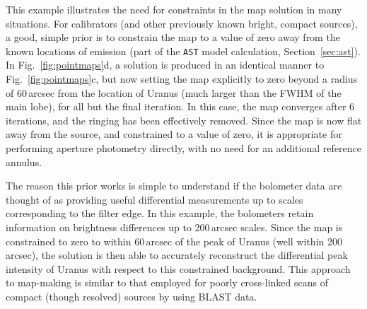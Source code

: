 \documentclass[useAMS,usenatbib,nofootinbib]{mn2e}
\newcommand{\model}[1]{\texttt{#1}}
\begin{document}
This example illustrates the need for constraints in the map solution
in many situations. For calibrators (and other previously known
bright, compact sources), a good, simple prior is to constrain the map
to a value of zero away from the known locations of emission (part of
the \model{AST} model calculation, Section~\ref{sec:ast}).  In
Fig.~\ref{fig:pointmaps}d, a solution is produced in an identical
manner to Fig.~\ref{fig:pointmaps}c, but now setting the map
explicitly to zero beyond a radius of 60\,arcsec from the location of
Uranus (much larger than the FWHM of the main lobe), for all but the
final iteration. In this case, the map converges after 6 iterations,
and the ringing has been effectively removed. Since the map is now
flat away from the source, and constrained to a value of zero, it is
appropriate for performing aperture photometry directly, with no need
for an additional reference annulus.

The reason this prior works is simple to understand if the bolometer
data are thought of as providing useful differential measurements up
to scales corresponding to the filter edge. In this example, the
bolometers retain information on brightness differences up to
200\,arcsec scales. Since the map is constrained to zero to within
60\,arcsec of the peak of Uranus (well within 200\,arcsec), the
solution is then able to accurately reconstruct the differential peak
intensity of Uranus with respect to this constrained background.  This
approach to map-making is similar to that employed for poorly
cross-linked scans of compact (though resolved) sources by
\citet{wiebe2009} using BLAST data.
\end{document}
